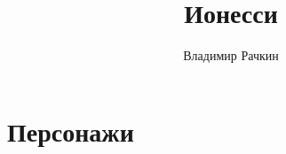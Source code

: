 \documentclass[titlepage]{book}
\title{\textbf{\huge{Ионесси}}}
\author{
    Владимир Рачкин
}
\date{}
\begin{document}

\maketitle


\tableofcontents

\clearpage



\part{Персонажи}
\end{document}
